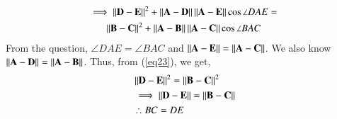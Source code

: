 \documentclass[journal,12pt,twocolumn]{IEEEtran}
\begin{document}
\begin{multline}
\implies \left\lVert\mathbf{D}-\mathbf{E}\right\rVert^2+ \left\lVert\mathbf{A}-\mathbf{D}\right\rVert\left\lVert\mathbf{A}-\mathbf{E}\right\rVert\cos \angle DAE = \\
 \left\lVert\mathbf{B}-\mathbf{C}\right\rVert^2+\left\lVert\mathbf{A}-\mathbf{B}\right\rVert \left\lVert\mathbf{A}-\mathbf{C}\right\rVert\cos \angle BAC \label{eq23}	
\end{multline}
From the question, $\angle DAE = \angle BAC$ and $\left\lVert\mathbf{A}-\mathbf{E}\right\rVert = \left\lVert\mathbf{A}-\mathbf{C}\right\rVert$. We also know $\left\lVert\mathbf A -\mathbf D\right\rVert= \left\lVert \mathbf A- \mathbf B\right\rVert$. 
Thus, from (\ref{eq23}), we get,
\begin{align}
	& \left\lVert\mathbf{D}-\mathbf{E}\right\rVert^2 = \left\lVert\mathbf{B}-\mathbf{C}\right\rVert^2 \label{eq24}\\
	& \implies\left\lVert\mathbf{D}-\mathbf{E}\right\rVert = \left\lVert\mathbf{B}-\mathbf{C}\right\rVert\label{eq25}\\
	& \therefore BC=DE\label{eq26}
\end{align}
\end{document}
